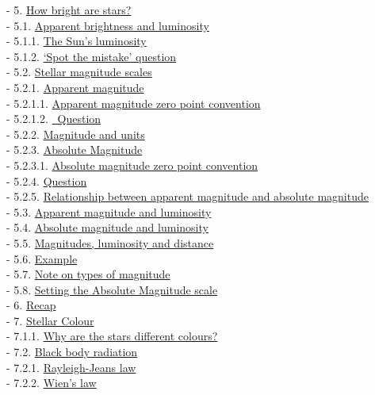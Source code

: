 \documentclass[
  letterpaper,
  DIV=11,
  numbers=noendperiod]{scrartcl}
\begin{document}
- 5. \protect\hyperlink{toc5_}{How bright are stars?}\\
- 5.1. \protect\hyperlink{toc5_1_}{Apparent brightness and luminosity}\\
- 5.1.1. \protect\hyperlink{toc5_1_1_}{The Sun's luminosity}\\
- 5.1.2. \protect\hyperlink{toc5_1_2_}{`Spot the mistake' question}\\
- 5.2. \protect\hyperlink{toc5_2_}{Stellar magnitude scales}\\
- 5.2.1. \protect\hyperlink{toc5_2_1_}{Apparent magnitude}\\
- 5.2.1.1. \protect\hyperlink{toc5_2_1_1_}{Apparent magnitude zero point
convention}\\
- 5.2.1.2. \protect\hyperlink{toc5_2_1_2_}{~Question}\\
- 5.2.2. \protect\hyperlink{toc5_2_2_}{Magnitude and units}\\
- 5.2.3. \protect\hyperlink{toc5_2_3_}{Absolute Magnitude}\\
- 5.2.3.1. \protect\hyperlink{toc5_2_3_1_}{Absolute magnitude zero point
convention}\\
- 5.2.4. \protect\hyperlink{toc5_2_4_}{Question}\\
- 5.2.5. \protect\hyperlink{toc5_2_5_}{Relationship between apparent
magnitude and absolute magnitude}\\
- 5.3. \protect\hyperlink{toc5_3_}{Apparent magnitude and luminosity}\\
- 5.4. \protect\hyperlink{toc5_4_}{Absolute magnitude and luminosity}\\
- 5.5. \protect\hyperlink{toc5_5_}{Magnitudes, luminosity and
distance}\\
- 5.6. \protect\hyperlink{toc5_6_}{Example}\\
- 5.7. \protect\hyperlink{toc5_7_}{Note on types of magnitude}\\
- 5.8. \protect\hyperlink{toc5_8_}{Setting the Absolute Magnitude
scale}\\
- 6. \protect\hyperlink{toc6_}{Recap}\\
- 7. \protect\hyperlink{toc7_}{Stellar Colour}\\
- 7.1.1. \protect\hyperlink{toc7_1_1_}{Why are the stars different
colours?}\\
- 7.2. \protect\hyperlink{toc7_2_}{Black body radiation}\\
- 7.2.1. \protect\hyperlink{toc7_2_1_}{Rayleigh-Jeans law}\\
- 7.2.2. \protect\hyperlink{toc7_2_2_}{Wien's law}\\
\end{document}
